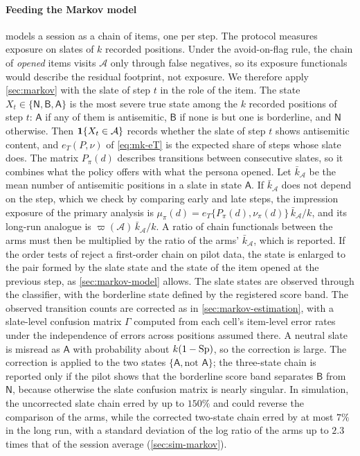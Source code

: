 \paragraph{Feeding the Markov model}
 models a session as a chain of items, one per step. The protocol measures exposure on slates of $k$ recorded positions. Under the avoid-on-flag rule, the chain of \emph{opened} items visits $\mathcal A$ only through false negatives, so its exposure functionals would describe the residual footprint, not exposure. We therefore apply \cref{sec:markov} with the slate of step $t$ in the role of the item. The state $X_t\in\{\mathsf N,\mathsf B,\mathsf A\}$ is the most severe true state among the $k$ recorded positions of step $t$: $\mathsf A$ if any of them is antisemitic, $\mathsf B$ if none is but one is borderline, and $\mathsf N$ otherwise. Then $\mathbf{1}\!\left\{X_t\in\mathcal A\right\}$ records whether the slate of step $t$ shows antisemitic content, and $e_T(P,\nu)$ of \eqref{eq:mk-eT} is the expected share of steps whose slate does. The matrix $P_\pi(d)$ describes transitions between consecutive slates, so it combines what the policy offers with what the persona opened. Let $\bar k_{\mathcal A}$ be the mean number of antisemitic positions in a slate in state $\mathsf A$. If $\bar k_{\mathcal A}$ does not depend on the step, which we check by comparing early and late steps, the impression exposure of the primary analysis is $\mu_\pi(d)=e_T\{P_\pi(d),\nu_\pi(d)\}\,\bar k_{\mathcal A}/k$, and its long-run analogue is $\varpi(\mathcal A)\,\bar k_{\mathcal A}/k$. A ratio of chain functionals between the arms must then be multiplied by the ratio of the arms' $\bar k_{\mathcal A}$, which is reported. If the order tests of \citet{anderson1957} reject a first-order chain on pilot data, the state is enlarged to the pair formed by the slate state and the state of the item opened at the previous step, as \cref{sec:markov-model} allows. The slate states are observed through the classifier, with the borderline state defined by the registered score band. The observed transition counts are corrected as in \cref{sec:markov-estimation}, with a slate-level confusion matrix $\Gamma$ computed from each cell's item-level error rates under the independence of errors across positions assumed there. A neutral slate is misread as $\mathsf A$ with probability about $k(1-\mathrm{Sp})$, so the correction is large.
The correction is applied to the two states $\{\mathsf A,\text{not }\mathsf A\}$; the three-state chain is reported only if the pilot shows that the borderline score band separates $\mathsf B$ from $\mathsf N$, because otherwise the slate confusion matrix is nearly singular. In simulation, the uncorrected slate chain erred by up to $150\%$ and could reverse the comparison of the arms, while the corrected two-state chain erred by at most $7\%$ in the long run, with a standard deviation of the log ratio of the arms up to $2.3$ times that of the session average (\cref{sec:sim-markov}).
